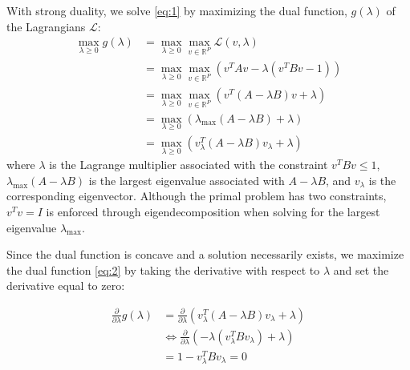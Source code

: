 \documentclass[12pt]{article}
\begin{document}
With strong duality, we solve \ref{eq:1} by maximizing the dual function, $g(\lambda)$ of the Lagrangians $\mathcal{L}$:
\begin{align}
    \max_{\lambda \geq 0}{g(\lambda)} &= \max_{\lambda \geq 0}{\max_{v\in \mathbb{R}^{P}}{\mathcal{L}}}\left(v,\lambda\right) \nonumber\\
                                        &= \max_{\lambda \geq 0}{\max_{v\in \mathbb{R}^{P}}{\left( v^TAv - \lambda\left(v^TBv - 1\right)\right)}} \nonumber\\
                                        &= \max_{\lambda \geq 0}{\max_{v\in \mathbb{R}^{P}}{\left(v^T\left(A - \lambda B\right)v + \lambda\right)}}\nonumber\\
                                        &= \max_{\lambda \geq 0}{\left(\lambda_{\text{max}}\left(A - \lambda B\right) + \lambda\right)} \nonumber\\
                                        &= \max_{\lambda \geq 0}{\left(v_{\lambda}^T\left(A - \lambda B\right) v_{\lambda}+ \lambda\right)} \label{eq:2}
\end{align}
where $\lambda$ is the Lagrange multiplier associated with the constraint $v^T Bv \leq 1$, $\lambda_{\max}(A - \lambda B)$ is the largest eigenvalue associated with $A - \lambda B$, and $v_{\lambda}$ is the corresponding eigenvector. Although the primal problem has two constraints, $v^T v = I$ is enforced through eigendecomposition when solving for the largest eigenvalue $\lambda_{\text{max}}$. %

Since the dual function is concave and a solution necessarily exists, we maximize the dual function \eqref{eq:2} by taking the derivative with respect to $\lambda$ and set the derivative equal to zero: 

\begin{align}
    \frac{\partial}{\partial\lambda} g(\lambda) &= \frac{\partial}{\partial\lambda} \left(v_{\lambda}^T\left(A - \lambda B\right) v_{\lambda}+ \lambda\right)\nonumber \\ 
                                                &\Leftrightarrow \frac{\partial}{\partial\lambda}\left( -\lambda \left(v_{\lambda}^{T} Bv_{\lambda}\right) + \lambda \right) \nonumber\\
                                                &= 1-v_\lambda^{T}B v_{\lambda} = 0 \label{eq:3}
\end{align}
\end{document}
